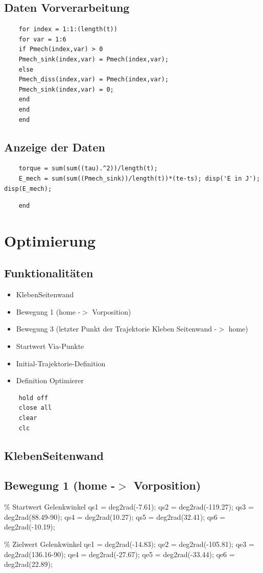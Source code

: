 \subsection*{Daten Vorverarbeitung}
%
\begin{lstlisting}
	for index = 1:1:(length(t))
	for var = 1:6
	if Pmech(index,var) > 0
	Pmech_sink(index,var) = Pmech(index,var);
	else
	Pmech_diss(index,var) = Pmech(index,var);
	Pmech_sink(index,var) = 0;
	end
	end
	end
\end{lstlisting}
%
\subsection*{Anzeige der Daten}
%
\begin{lstlisting}
	torque = sum(sum((tau).^2))/length(t);
	E_mech = sum(sum((Pmech_sink))/length(t))*(te-ts); disp('E in J'); disp(E_mech);
\end{lstlisting}
\begin{lstlisting}
	end
\end{lstlisting}
%
%
\section{Optimierung}
\label{acc:optimierer}
%
\subsection*{Funktionalitäten}
%
\begin{itemize}
	\setlength{\itemsep}{-1ex}
	\item KlebenSeitenwand
	\item Bewegung 1 (home -\ensuremath{>} Vorposition)
	\item Bewegung 3 (letzter Punkt der Trajektorie Kleben Seitenwand -\ensuremath{>} home)
	\item Startwert Via-Punkte
	\item Initial-Trajektorie-Definition
	\item Definition Optimierer
\end{itemize}
\begin{lstlisting}
	hold off
	close all
	clear
	clc
\end{lstlisting}
%
\subsection*{KlebenSeitenwand}
%
\subsection*{Bewegung 1 (home -\ensuremath{>} Vorposition)}
%
\begin{par}
	\% Startwert Gelenkwinkel qs1 = deg2rad(-7.61); qs2 = deg2rad(-119.27); qs3 = deg2rad(88.49-90); qs4 = deg2rad(10.27); qs5 = deg2rad(32.41); qs6 = deg2rad(-10.19);
\end{par} \vspace{1em}
\begin{par}
	\% Zielwert Gelenkwinkel qe1 = deg2rad(-14.83); qe2 = deg2rad(-105.81); qe3 = deg2rad(136.16-90); qe4 = deg2rad(-27.67); qe5 = deg2rad(-33.44); qe6 = deg2rad(22.89);
\end{par} \vspace{1em}
%
